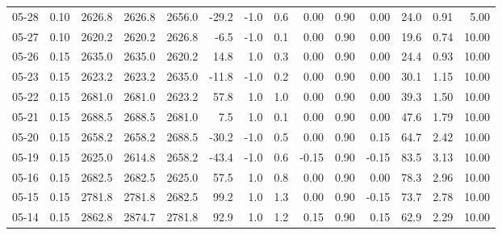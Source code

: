 \begin{threeparttable}
{\begin{tabular}{lrrrrrrrrrrrrr}
  05-28 &     0.10 & 2626.8 & 2626.8 & 2656.0 &      -29.2 &                     -1.0 &                 0.6 &       0.00 &      0.90 &           0.00 &             24.0 &            0.91 &                   5.00 \\
  05-27 &     0.10 & 2620.2 & 2620.2 & 2626.8 &       -6.5 &                     -1.0 &                 0.1 &       0.00 &      0.90 &           0.00 &             19.6 &            0.74 &                  10.00 \\
  05-26 &     0.15 & 2635.0 & 2635.0 & 2620.2 &       14.8 &                      1.0 &                 0.3 &       0.00 &      0.90 &           0.00 &             24.4 &            0.93 &                  10.00 \\
  05-23 &     0.15 & 2623.2 & 2623.2 & 2635.0 &      -11.8 &                     -1.0 &                 0.2 &       0.00 &      0.90 &           0.00 &             30.1 &            1.15 &                  10.00 \\
  05-22 &     0.15 & 2681.0 & 2681.0 & 2623.2 &       57.8 &                      1.0 &                 1.0 &       0.00 &      0.90 &           0.00 &             39.3 &            1.50 &                  10.00 \\
  05-21 &     0.15 & 2688.5 & 2688.5 & 2681.0 &        7.5 &                      1.0 &                 0.1 &       0.00 &      0.90 &           0.00 &             47.6 &            1.79 &                  10.00 \\
  05-20 &     0.15 & 2658.2 & 2658.2 & 2688.5 &      -30.2 &                     -1.0 &                 0.5 &       0.00 &      0.90 &           0.15 &             64.7 &            2.42 &                  10.00 \\
  05-19 &     0.15 & 2625.0 & 2614.8 & 2658.2 &      -43.4 &                     -1.0 &                 0.6 &      -0.15 &      0.90 &          -0.15 &             83.5 &            3.13 &                  10.00 \\
  05-16 &     0.15 & 2682.5 & 2682.5 & 2625.0 &       57.5 &                      1.0 &                 0.8 &       0.00 &      0.90 &           0.00 &             78.3 &            2.96 &                  10.00 \\
  05-15 &     0.15 & 2781.8 & 2781.8 & 2682.5 &       99.2 &                      1.0 &                 1.3 &       0.00 &      0.90 &          -0.15 &             73.7 &            2.78 &                  10.00 \\
  05-14 &     0.15 & 2862.8 & 2874.7 & 2781.8 &       92.9 &                      1.0 &                 1.2 &       0.15 &      0.90 &           0.15 &             62.9 &            2.29 &                  10.00 \\

\end{tabular}}
\end{threeparttable}
